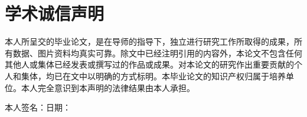 \chapter*{学术诚信声明}
\fontsize{15}{20}\selectfont
	本人所呈交的毕业论文，是在导师的指导下，独立进行研究工作所取得的成果，所有数据、图片资料均真实可靠。除文中已经注明引用的内容外，本论文不包含任何其他人或集体已经发表或撰写过的作品或成果。对本论文的研究作出重要贡献的个人和集体，均已在文中以明确的方式标明。本毕业论文的知识产权归属于培养单位。本人完全意识到本声明的法律结果由本人承担。
\vspace{2\baselineskip}
	
本人签名：\hfill 日期： \hspace{4cm}

\endinput
